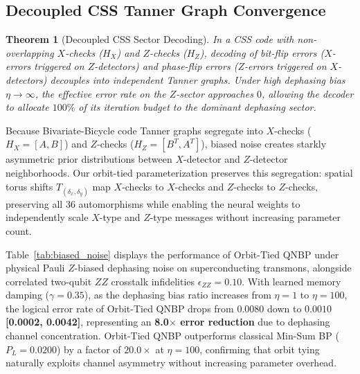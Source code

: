 \documentclass[journal]{IEEEtran}
\newtheorem{theorem}{Theorem}
\begin{document}
\subsection{Decoupled CSS Tanner Graph Convergence}
\begin{theorem}[Decoupled CSS Sector Decoding]
In a CSS code with non-overlapping $X$-checks ($H_X$) and $Z$-checks ($H_Z$), decoding of bit-flip errors ($X$-errors triggered on $Z$-detectors) and phase-flip errors ($Z$-errors triggered on $X$-detectors) decouples into independent Tanner graphs. Under high dephasing bias $\eta \to \infty$, the effective error rate on the $Z$-sector approaches $0$, allowing the decoder to allocate $100\%$ of its iteration budget to the dominant dephasing sector.
\end{theorem}

Because Bivariate-Bicycle code Tanner graphs segregate into $X$-checks ($H_X = [A, B]$) and $Z$-checks ($H_Z = [B^T, A^T]$), biased noise creates starkly asymmetric prior distributions between $X$-detector and $Z$-detector neighborhoods. Our orbit-tied parameterization preserves this segregation: spatial torus shifts $T_{(\delta_x, \delta_y)}$ map $X$-checks to $X$-checks and $Z$-checks to $Z$-checks, preserving all 36 automorphisms while enabling the neural weights to independently scale $X$-type and $Z$-type messages without increasing parameter count.

Table~\ref{tab:biased_noise} displays the performance of Orbit-Tied QNBP under physical Pauli $Z$-biased dephasing noise on superconducting transmons, alongside correlated two-qubit $ZZ$ crosstalk infidelities $\epsilon_{ZZ} = 0.10$. With learned memory damping ($\gamma=0.35$), as the dephasing bias ratio increases from $\eta=1$ to $\eta=100$, the logical error rate of Orbit-Tied QNBP drops from $0.0080$ down to \textbf{$0.0010$ [0.0002, 0.0042]}, representing an \textbf{8.0$\times$ error reduction} due to dephasing channel concentration. Orbit-Tied QNBP outperforms classical Min-Sum BP ($P_L = 0.0200$) by a factor of $\mathbf{20.0\times}$ at $\eta=100$, confirming that orbit tying naturally exploits channel asymmetry without increasing parameter overhead.
\end{document}
